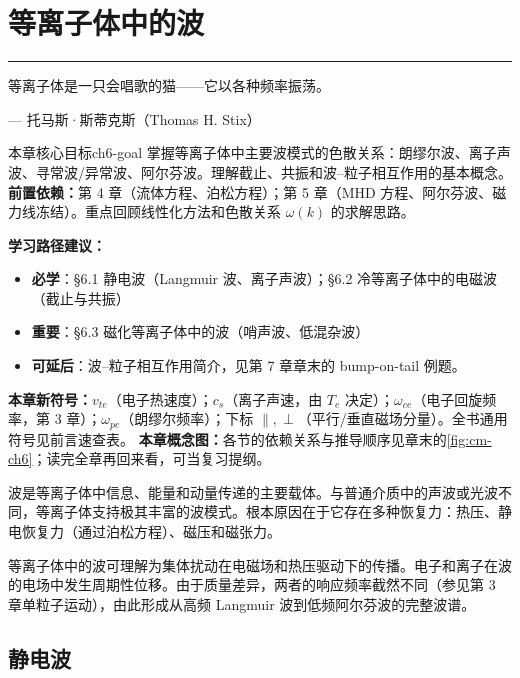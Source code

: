 \documentclass[12pt,a4paper,openany,oneside]{book}
\newcommand{\diffmarktext}[1]{%
  \textcolor{coverMid!80}{\rule[-0.1em]{2pt}{0.9em}}\,%
  \textcolor{coverMid}{\footnotesize\textbf{[#1]}}%
}
\newcommand{\difficulty}[1]{\marginnote{\raggedright\diffmarktext{#1}}}
\let\plainepigraph\epigraph
\renewcommand{\epigraph}[2]{%
  \par\addvspace{1.5pt}\noindent\hfill{\color{figAmber!75}\rule{2.8cm}{0.6pt}}\par
  \vspace{0.6pt}\plainepigraph{#1}{#2}}
\begin{document}



\chapter{等离子体中的波}\label{ch:6}
\epigraph{等离子体是一只会唱歌的猫——它以各种频率振荡。}{--- 托马斯·斯蒂克斯（Thomas H. Stix）}

\begin{insight}{本章核心目标}{ch6-goal}
掌握等离子体中主要波模式的色散关系：朗缪尔波、离子声波、寻常波/异常波、阿尔芬波。理解截止、共振和波--粒子相互作用的基本概念。
\tcblower
\textbf{前置依赖：}第 4 章（流体方程、泊松方程）；第 5 章（MHD 方程、阿尔芬波、磁力线冻结）。重点回顾线性化方法和色散关系 $\omega(k)$ 的求解思路。

\textbf{学习路径建议：}

\begin{itemize}[leftmargin=*]
\item[\textcolor{red}{$\blacksquare$}] \textbf{必学}：\S 6.1 静电波（Langmuir 波、离子声波）；\S 6.2 冷等离子体中的电磁波（截止与共振）
\item[\textcolor{orange}{$\blacksquare$}] \textbf{重要}：\S 6.3 磁化等离子体中的波（哨声波、低混杂波）
\item[\textcolor{green}{$\blacksquare$}] \textbf{可延后}：波--粒子相互作用简介，见第 7 章章末的 bump-on-tail 例题。
\end{itemize}

\textbf{本章新符号：}$v_{te}$（电子热速度）；$c_s$（离子声速，由 $T_e$ 决定）；$\omega_{ce}$（电子回旋频率，第 3 章）；$\omega_{pe}$（朗缪尔频率）；下标 $\parallel,\perp$（平行/垂直磁场分量）。全书通用符号见前言速查表。
\textbf{本章概念图：}各节的依赖关系与推导顺序见章末的\cref{fig:cm-ch6}；读完全章再回来看，可当复习提纲。
\end{insight}

波是等离子体中信息、能量和动量传递的主要载体。与普通介质中的声波或光波不同，等离子体支持极其丰富的波模式。根本原因在于它存在多种恢复力：热压、静电恢复力（通过泊松方程）、磁压和磁张力。

等离子体中的波可理解为集体扰动在电磁场和热压驱动下的传播。电子和离子在波的电场中发生周期性位移。由于质量差异，两者的响应频率截然不同（参见第 3 章单粒子运动），由此形成从高频 Langmuir 波到低频阿尔芬波的完整波谱。

\section{静电波}\difficulty{基础}
\label{sec:ch6-es}
\end{document}
